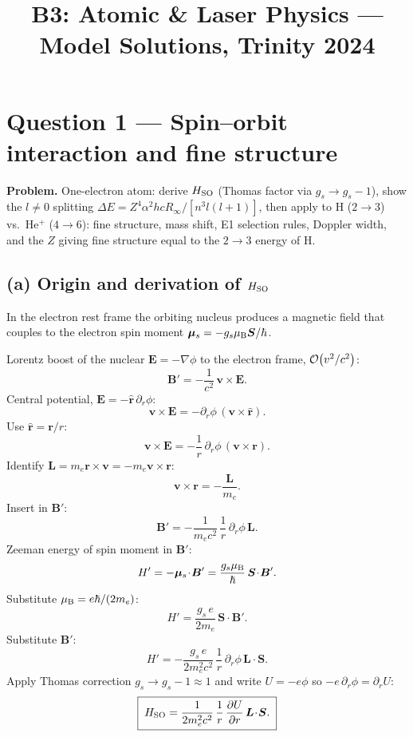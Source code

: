 \documentclass[11pt]{article}
\title{B3: Atomic \& Laser Physics --- Model Solutions, Trinity 2024}
\author{}
\date{}
\begin{document}
\maketitle

\section*{Question 1 --- Spin--orbit interaction and fine structure}

\textbf{Problem.} One-electron atom: derive $H_{\rm SO}$ (Thomas factor via $g_s\to g_s-1$), show the $l\neq 0$ splitting $\Delta E=Z^4\alpha^2 hcR_\infty/[n^3 l(l+1)]$, then apply to H ($2\to 3$) vs.\ He$^+$ ($4\to 6$): fine structure, mass shift, E1 selection rules, Doppler width, and the $Z$ giving fine structure equal to the $2\to 3$ energy of H.

\subsection*{(a) Origin and derivation of $H_{\rm SO}$}

In the electron rest frame the orbiting nucleus produces a magnetic field that couples to the electron spin moment $\bm\mu_s=-g_s\mu_{\rm B}\bm S/\hbar$.

Lorentz boost of the nuclear $\bm E=-\nabla\phi$ to the electron frame, $\order{v^2/c^2}$:
\[
\bm B'=-\frac{1}{c^{2}}\,\bm v\times\bm E.
\]
Central potential, $\bm E=-\hat{\bm r}\,\partial_r\phi$:
\[
\bm v\times\bm E=-\partial_r\phi\,(\bm v\times\hat{\bm r}).
\]
Use $\hat{\bm r}=\bm r/r$:
\[
\bm v\times\bm E=-\frac{1}{r}\,\partial_r\phi\,(\bm v\times\bm r).
\]
Identify $\bm L=m_e\bm r\times\bm v=-m_e\bm v\times\bm r$:
\[
\bm v\times\bm r=-\frac{\bm L}{m_e}.
\]
Insert in $\bm B'$:
\[
\bm B'=-\frac{1}{m_e c^{2}}\,\frac{1}{r}\,\partial_r\phi\,\bm L.
\]
Zeeman energy of spin moment in $\bm B'$:
\[
H'=-\bm\mu_s\!\cdot\!\bm B'=\frac{g_s\mu_{\rm B}}{\hbar}\,\bm S\!\cdot\!\bm B'.
\]
Substitute $\mu_{\rm B}=e\hbar/(2m_e)$:
\[
H'=\frac{g_s\,e}{2 m_e}\,\bm S\!\cdot\!\bm B'.
\]
Substitute $\bm B'$:
\[
H'=-\frac{g_s\,e}{2 m_e^{2}c^{2}}\,\frac{1}{r}\,\partial_r\phi\,\bm L\!\cdot\!\bm S.
\]
Apply Thomas correction $g_s\to g_s-1\approx 1$ and write $U=-e\phi$ so $-e\,\partial_r\phi=\partial_r U$:
\begin{equation}
\boxed{\;H_{\rm SO}=\frac{1}{2 m_e^{2}c^{2}}\,\frac{1}{r}\,\frac{\partial U}{\partial r}\,\bm L\!\cdot\!\bm S.\;}
\label{eq:HSO-general}
\end{equation}
\end{document}
